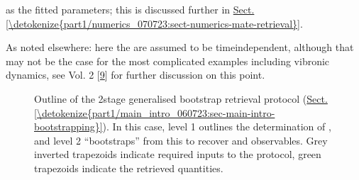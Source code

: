 \documentclass[letterpaper,table,10pt,english]{jupyterBook}
\begin{document}
{\hyperref[\detokenize{backmatter/glossary:term-radial-matrix-elements}]{}} as the fitted parameters; this is discussed further in \hyperref[\detokenize{part1/numerics_070723:sect-numerics-mate-retrieval}]{Sect.\@ \ref{\detokenize{part1/numerics_070723:sect-numerics-mate-retrieval}}}. %
\begin{footnote}[1]\sphinxAtStartFootnote
As noted elsewhere: here the {\hyperref[\detokenize{backmatter/glossary:term-radial-matrix-elements}]{}} are assumed to be time\sphinxhyphen{}independent, although that may not be the case for the most complicated examples including vibronic dynamics, see  Vol. 2 {[}\hyperlink{cite.backmatter/bibliography:id677}{9}{]} for further discussion on this point.
%
\end{footnote}

\begin{figure}[htbp]
\centering
\capstart

\noindent{}
\caption{Outline of the 2\sphinxhyphen{}stage generalised bootstrap {\hyperref[\detokenize{backmatter/glossary:term-radial-matrix-elements}]{}} retrieval protocol (\hyperref[\detokenize{part1/main_intro_060723:sec-main-intro-bootstrapping}]{Sect.\@ \ref{\detokenize{part1/main_intro_060723:sec-main-intro-bootstrapping}}}). In this case, level 1 outlines the determination of {\hyperref[\detokenize{backmatter/glossary:term-ADMs}]{}}, and level 2 “bootstraps” from this to recover {\hyperref[\detokenize{backmatter/glossary:term-radial-matrix-elements}]{}} and {\hyperref[\detokenize{backmatter/glossary:term-MF}]{}} observables. Grey inverted trapezoids indicate required inputs to the protocol, green trapezoids indicate the retrieved quantities.}\label{\detokenize{part1/numerics_070723:fig-bootstrap-fitting-diag}}\end{figure}
\end{document}
